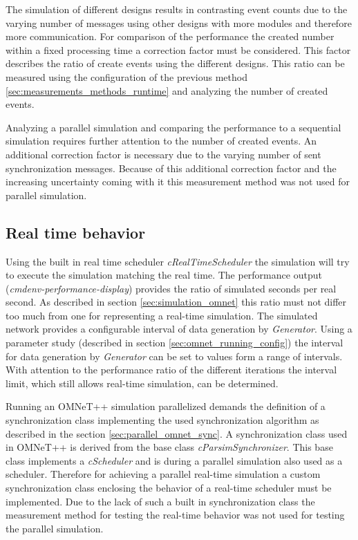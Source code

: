 The simulation of different designs results in contrasting event counts due to the varying number of messages using other designs with more modules and therefore more communication.
For comparison of the performance the created number within a fixed processing time a correction factor must be considered.
This factor describes the ratio of create events using the different designs.
This ratio can be measured using the configuration of the previous method \ref{sec:measurements_methods_runtime} and analyzing the number of created events.

Analyzing a parallel simulation and comparing the performance to a sequential simulation requires further attention to the number of created events.
An additional correction factor is necessary due to the varying number of sent synchronization messages.
Because of this additional correction factor and the increasing uncertainty coming with it this measurement method was not used for parallel simulation.

\subsection{Real time behavior}
\label{sec:measurements_methods_realtime}
Using the built in real time scheduler \emph{cRealTimeScheduler} the simulation will try to execute the simulation matching the real time.
The performance output (\emph{cmdenv-performance-display}) provides the ratio of simulated seconds per real second.
As described in section \ref{sec:simulation_omnet} this ratio must not differ too much from one for representing a real-time simulation.
The simulated network provides a configurable interval of data generation by \emph{Generator}.
Using a parameter study (described in section \ref{sec:omnet_running_config}) the interval for data generation by \emph{Generator} can be set to values form a range of intervals.
With attention to the performance ratio of the different iterations the interval limit, which still allows real-time simulation, can be determined.

Running an OMNeT++ simulation parallelized demands the definition of a synchronization class implementing the used synchronization algorithm as described in the section \ref{sec:parallel_omnet_sync}.
A synchronization class used in OMNeT++ is derived from the base class \emph{cParsimSynchronizer}.
This base class implements a \emph{cScheduler} and is during a parallel simulation also used as a scheduler.
Therefore for achieving a parallel real-time simulation a custom synchronization class enclosing the behavior of a real-time scheduler must be implemented.
Due to the lack of such a built in synchronization class the measurement method for testing the real-time behavior was not used for testing the parallel simulation.

